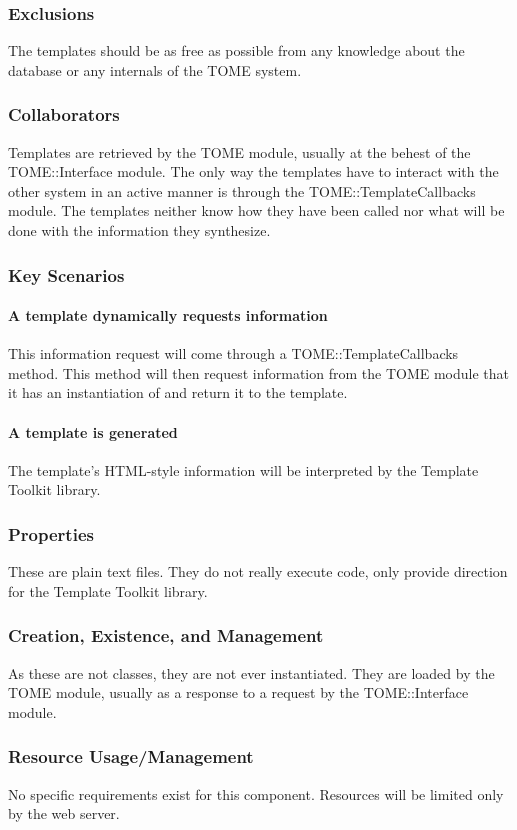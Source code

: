 \documentclass[12pt,titlepage]{article}
\begin{document}
\subsubsection{Exclusions}
The templates should be as free as possible from any knowledge about the database or any internals of the TOME system.
\subsubsection{Collaborators}
Templates are retrieved by the TOME module, usually at the behest of the TOME::Interface module.  The only way the templates have to interact with the other system in an active manner is through the TOME::TemplateCallbacks module.  The templates neither know how they have been called nor what will be done with the information they synthesize.
\subsubsection{Key Scenarios}
\paragraph{A template dynamically requests information}
This information request will come through a TOME::TemplateCallbacks method.  This method will then request information from the TOME module that it has an instantiation of and return it to the template.
\paragraph{A template is generated}
The template's HTML-style information will be interpreted by the Template Toolkit library.
\subsubsection{Properties}
These are plain text files.  They do not really execute code, only provide direction for the Template Toolkit library.
\subsubsection{Creation, Existence, and Management}
As these are not classes, they are not ever instantiated.  They are loaded by the TOME module, usually as a response to a request by the TOME::Interface module.
\subsubsection{Resource Usage/Management}
No specific requirements exist for this component.  Resources will be limited only by the web server.
\end{document}
